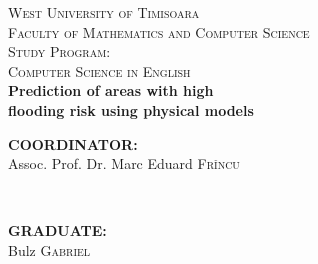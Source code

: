 \documentclass[12pt, a4paper]{report}
\begin{document}
\begin{titlepage}

\newcommand{\HRule}{\rule{\linewidth}{0.5mm}} %

\center %


\vspace{3cm}


\textsc{\LARGE West University of  Timisoara}\\[0.5cm] %
\textsc{\Large Faculty of Mathematics and Computer Science}\\[0.5cm] %
\textsc{\large Study Program: \\Computer Science in English}\\[6cm] %




{\Huge \bfseries Prediction of areas with high  }
\\[0.4cm]
{\Huge \bf flooding risk using physical models}\\[5cm] %
 


\begin{minipage}{0.4\textwidth}
\begin{flushleft} \large
\textbf{COORDINATOR:}\\
Assoc. Prof. Dr. Marc Eduard \textsc{Fr\^incu} %
\end{flushleft}
\end{minipage}
~
\begin{minipage}{0.4\textwidth}
\begin{flushright} \large
\textbf{GRADUATE:} \\
Bulz \textsc{Gabriel} %
\end{flushright}
\end{minipage}\\[1cm]


\end{titlepage}
\end{document}
